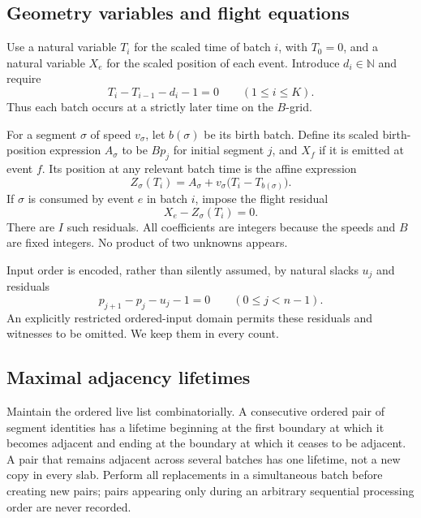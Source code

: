 \documentclass[11pt,letterpaper]{article}
\numberwithin{equation}{section}
\theoremstyle{definition}
\theoremstyle{remark}
\newcommand{\NN}{\mathbb N}
\begin{document}
\subsection{Geometry variables and flight equations}
Use a natural variable $T_i$ for the scaled time of batch $i$, with $T_0=0$, and a natural variable $X_e$ for the scaled position of each event. Introduce $d_i\in\NN$ and require
\begin{equation}\label{smc:sd:eq:time}
 T_i-T_{i-1}-d_i-1=0\qquad(1\le i\le K).
\end{equation}
Thus each batch occurs at a strictly later time on the $B$-grid.

For a segment $\sigma$ of speed $v_\sigma$, let $b(\sigma)$ be its birth batch. Define its scaled birth-position expression $A_\sigma$ to be $Bp_j$ for initial segment $j$, and $X_f$ if it is emitted at event $f$. Its position at any relevant batch time is the affine expression
\begin{equation}\label{smc:sd:eq:position}
 Z_\sigma(T_i)=A_\sigma+v_\sigma\bigl(T_i-T_{b(\sigma)}\bigr).
\end{equation}
If $\sigma$ is consumed by event $e$ in batch $i$, impose the flight residual
\begin{equation}\label{smc:sd:eq:flight}
 X_e-Z_\sigma(T_i)=0.
\end{equation}
There are $I$ such residuals. All coefficients are integers because the speeds and $B$ are fixed integers. No product of two unknowns appears.

Input order is encoded, rather than silently assumed, by natural slacks $u_j$ and residuals
\begin{equation}\label{smc:sd:eq:input}
 p_{j+1}-p_j-u_j-1=0\qquad(0\le j<n-1).
\end{equation}
An explicitly restricted ordered-input domain permits these residuals and witnesses to be omitted. We keep them in every count.

\subsection{Maximal adjacency lifetimes}
Maintain the ordered live list combinatorially. A consecutive ordered pair of segment identities has a lifetime beginning at the first boundary at which it becomes adjacent and ending at the boundary at which it ceases to be adjacent. A pair that remains adjacent across several batches has one lifetime, not a new copy in every slab. Perform all replacements in a simultaneous batch before creating new pairs; pairs appearing only during an arbitrary sequential processing order are never recorded.
\end{document}

